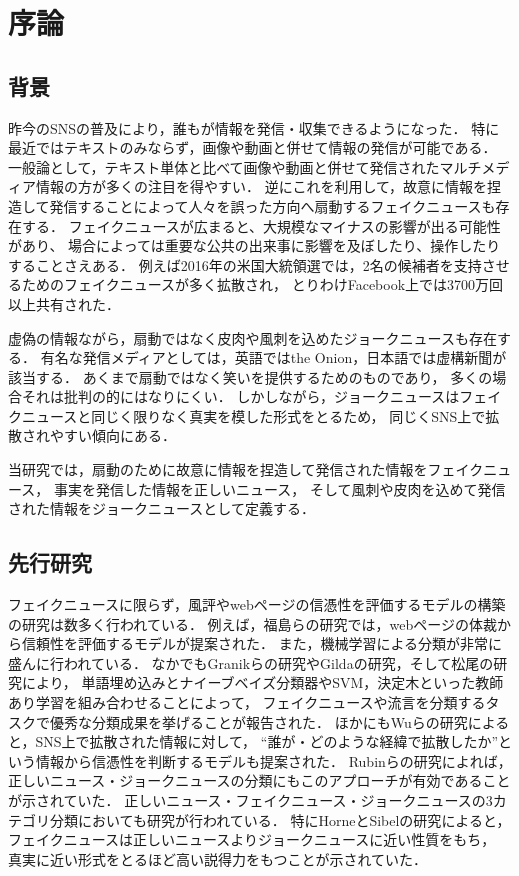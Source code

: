 \chapter{序論}
%
\section{背景}
昨今のSNSの普及により，誰もが情報を発信・収集できるようになった．
特に最近ではテキストのみならず，画像や動画と併せて情報の発信が可能である．
一般論として，テキスト単体と比べて画像や動画と併せて発信されたマルチメディア情報の方が多くの注目を得やすい．
逆にこれを利用して，故意に情報を捏造して発信することによって人々を誤った方向へ扇動するフェイクニュースも存在する．
フェイクニュースが広まると、大規模なマイナスの影響が出る可能性があり、
場合によっては重要な公共の出来事に影響を及ぼしたり、操作したりすることさえある．
例えば2016年の米国大統領選では，2名の候補者を支持させるためのフェイクニュースが多く拡散され，
とりわけFacebook上では3700万回以上共有された\cite{allcott2017social}．

虚偽の情報ながら，扇動ではなく皮肉や風刺を込めたジョークニュースも存在する．
有名な発信メディアとしては，英語ではthe Onion，日本語では虚構新聞が該当する．
あくまで扇動ではなく笑いを提供するためのものであり，
多くの場合それは批判の的にはなりにくい．
しかしながら，ジョークニュースはフェイクニュースと同じく限りなく真実を模した形式をとるため，
同じくSNS上で拡散されやすい傾向にある．

当研究では，扇動のために故意に情報を捏造して発信された情報をフェイクニュース，
事実を発信した情報を正しいニュース，
そして風刺や皮肉を込めて発信された情報をジョークニュースとして定義する．

\section{先行研究}
フェイクニュースに限らず，風評やwebページの信憑性を評価するモデルの構築の研究は数多く行われている．
例えば，福島らの研究\cite{福島隆寛2007web}では，webページの体裁から信頼性を評価するモデルが提案された．
また，機械学習による分類が非常に盛んに行われている．
なかでもGranikらの研究\cite{Granik8100379}やGildaの研究\cite{Gilda8305411}，そして松尾の研究\cite{松尾省吾2018master}により，
単語埋め込みとナイーブベイズ分類器やSVM，決定木といった教師あり学習を組み合わせることによって，
フェイクニュースや流言を分類するタスクで優秀な分類成果を挙げることが報告された．
ほかにもWuらの研究\cite{wu2018tracing}によると，SNS上で拡散された情報に対して，
``誰が・どのような経緯で拡散したか''という情報から信憑性を判断するモデルも提案された． 
Rubinらの研究\cite{rubin2016fake}によれば，正しいニュース・ジョークニュースの分類にもこのアプローチが有効であることが示されていた．
正しいニュース・フェイクニュース・ジョークニュースの3カテゴリ分類においても研究が行われている．
特にHorneとSibelの研究\cite{horne2017just}によると，フェイクニュースは正しいニュースよりジョークニュースに近い性質をもち，
真実に近い形式をとるほど高い説得力をもつことが示されていた．

